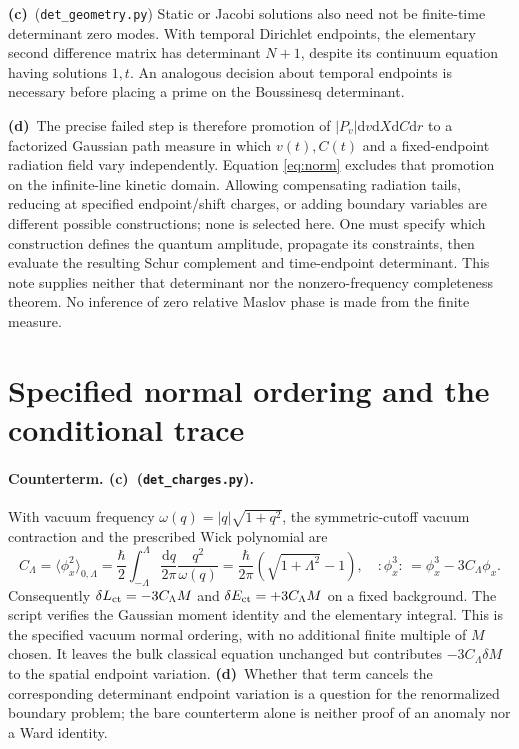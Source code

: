 \documentclass[11pt,a4paper]{article}
\newcommand{\Lc}{\textbf{(c)}}
\newcommand{\Ld}{\textbf{(d)}}
\newcommand{\G}{\texttt{det\_geometry.py}}
\newcommand{\Ccheck}{\texttt{det\_charges.py}}
\newcommand{\dd}{\mathrm d}
\begin{document}
\Lc\ (\G) Static or Jacobi solutions also need not be finite-time determinant
zero modes. With temporal Dirichlet endpoints, the elementary second
difference matrix has determinant $N+1$, despite its continuum equation
having solutions $1,t$. An analogous decision about temporal endpoints is
necessary before placing a prime on the Boussinesq determinant.

\Ld\ The precise failed step is therefore promotion of
$|P_v|\dd v\dd X\dd C\dd r$ to a factorized Gaussian path measure in which
$v(t),C(t)$ and a fixed-endpoint radiation field vary independently. Equation
\eqref{eq:norm} excludes that promotion on the infinite-line kinetic domain.
Allowing compensating radiation tails, reducing at specified endpoint/shift
charges, or adding boundary variables are different possible constructions;
none is selected here. One must specify which construction defines the
quantum amplitude, propagate its constraints, then evaluate the resulting
Schur complement and time-endpoint determinant. This note supplies neither
that determinant nor the nonzero-frequency completeness theorem. No inference
of zero relative Maslov phase is made from the finite measure.

\section{Specified normal ordering and the conditional trace}
\paragraph{Counterterm. \Lc\ (\Ccheck).}
With vacuum frequency $\omega(q)=|q|\sqrt{1+q^2}$, the symmetric-cutoff vacuum
contraction and the prescribed Wick polynomial are
\begin{equation}
 C_\Lambda=\langle\phi_x^2\rangle_{0,\Lambda}
 =\frac{\hbar}{2}\int_{-\Lambda}^{\Lambda}\frac{\dd q}{2\pi}
                       \frac{q^2}{\omega(q)}
 =\frac{\hbar}{2\pi}(\sqrt{1+\Lambda^2}-1),\quad
 :\!\phi_x^3\!:\,=\phi_x^3-3C_\Lambda\phi_x.
\end{equation}
Consequently $\delta L_{\rm ct}=-3C_\Lambda M$ and
$\delta E_{\rm ct}=+3C_\Lambda M$ on a fixed background.
The script verifies the Gaussian moment identity and the elementary integral.
This is the specified vacuum normal ordering, with no additional finite
multiple of $M$ chosen. It leaves the bulk classical equation unchanged but
contributes $-3C_\Lambda\delta M$ to the spatial endpoint variation.
\Ld\ Whether that term cancels the corresponding determinant endpoint
variation is a question for the renormalized boundary problem; the bare
counterterm alone is neither proof of an anomaly nor a Ward identity.
\end{document}
